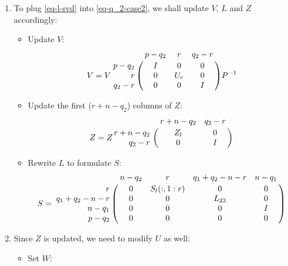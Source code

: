 \begin{enumerate}
\begin{enumerate}
\begin{itemize}
                    \end{itemize} 
                \item To plug \eqref{eq-l-svd} into \eqref{eq-q_2-case2}, we shall update $V$, $L$ and $Z$ accordingly:
                    \begin{itemize}
                        \item Update $V$:
                            \begin{displaymath}
                                V = V\bordermatrix{ & p-q_2 & r & q_2-r \cr
                                    \hfill p-q_2 & I & 0 & 0 \cr
                                    \hfill r & 0 & U_{r} & 0 \cr
                                    \hfill q_2-r & 0 & 0 & I}P^{-1}
                            \end{displaymath}
                        \item Update the first ($r+n-q_2$) columns of $Z$:
                            \begin{displaymath}
                                Z = Z\bordermatrix{ & r+n-q_2 & q_2-r \cr
                                    \hfill r+n-q_2 & Z_{l} & 0 \cr
                                    \hfill q_2-r & 0 & I}
                            \end{displaymath}
                        \item Rewrite $L$ to formulate $S$:
                            \begin{displaymath}
                                S = \bordermatrix{ & n-q_2 & r & q_1+q_2-n-r & n-q_1 \cr
                                    \hfill r & 0 & S_{l}(:,1:r) & 0 & 0 \cr
                                    \hfill q_1+q_2-n-r & 0 & 0 & L_{23} & 0 \cr
                                    \hfill n-q_1 & 0 & 0 & 0 & I \cr
                                    \hfill p-q_2 & 0 & 0 & 0 & 0 }
                            \end{displaymath}
                    \end{itemize}
                \item Since $Z$ is updated, we need to modify $U$ as well:
                        \begin{itemize}
                            \item Set $W$:
                            

\end{itemize}
\end{enumerate}
\end{enumerate}
